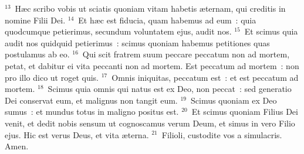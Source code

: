 ${}^{13}$~H\ae c scribo vobis ut sciatis quoniam vitam habetis \ae ternam, qui creditis in nomine Filii Dei.
${}^{14}$~Et h\ae c est fiducia, quam habemus ad eum~: quia quodcumque petierimus, secundum voluntatem ejus, audit nos.
${}^{15}$~Et scimus quia audit nos quidquid petierimus~: scimus quoniam habemus petitiones quas postulamus ab eo.
${}^{16}$~Qui scit fratrem suum peccare peccatum non ad mortem, petat, et dabitur ei vita peccanti non ad mortem. Est peccatum ad mortem~: non pro illo dico ut roget quis.
${}^{17}$~Omnis iniquitas, peccatum est~: et est peccatum ad mortem.
${}^{18}$~Scimus quia omnis qui natus est ex Deo, non peccat~: sed generatio Dei conservat eum, et malignus non tangit eum.
${}^{19}$~Scimus quoniam ex Deo sumus~: et mundus totus in maligno positus est.
${}^{20}$~Et scimus quoniam Filius Dei venit, et dedit nobis sensum ut cognoscamus verum Deum, et simus in vero Filio ejus. Hic est verus Deus, et vita \ae terna.
${}^{21}$~Filioli, custodite vos a simulacris. Amen.

